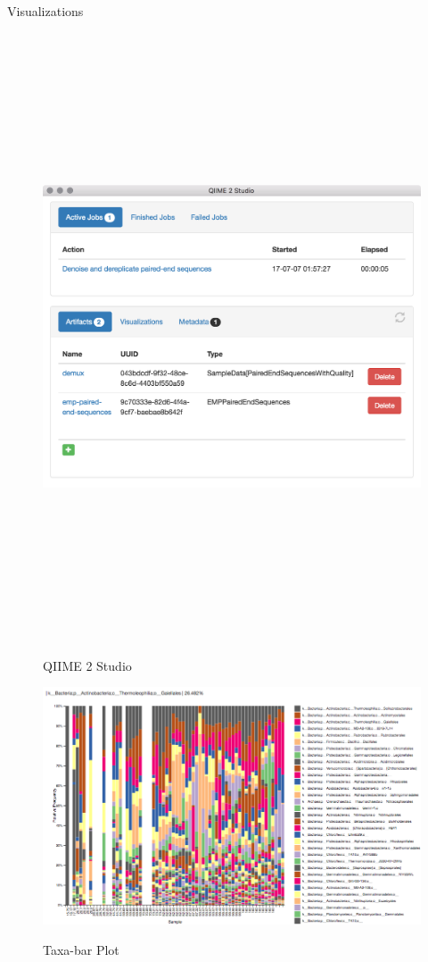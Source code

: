 \documentclass[final]{beamer}
\newlength{\colwidth}
\begin{document}
\begin{frame}[t]
\begin{columns}[t]
\begin{column}{\colwidth}
\begin{block}{Visualizations}
    \begin{figure}[tph!]
      {\includegraphics[height=18cm]{assets/q2studio}}
      \caption{QIIME 2 Studio}
      \label{fig:q2studio}
    \end{figure}

    \begin{figure}[tph!]
      {\includegraphics[width=\linewidth]{assets/taxabar-plot}}
      \caption{Taxa-bar Plot}
      \label{fig:taxabar-plot}
    \end{figure}
  \end{block}


\end{column}
\end{columns}
\end{frame}
\end{document}
